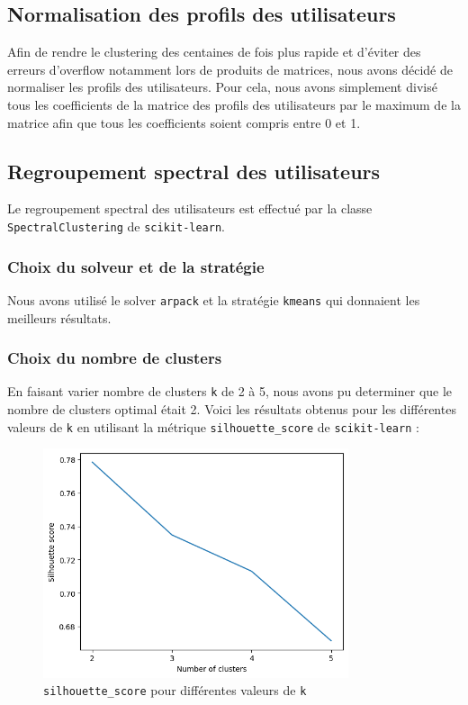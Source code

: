 \documentclass{article}
\begin{document}
\subsection{Normalisation des profils des utilisateurs}
Afin de rendre le clustering des centaines de fois plus rapide et d'éviter des erreurs
d'overflow notamment lors de produits de matrices, nous avons
décidé de normaliser les profils des utilisateurs. Pour cela, nous avons
simplement divisé tous les coefficients de la matrice des profils des utilisateurs
par le maximum de la matrice afin que tous les coefficients soient compris
entre 0 et 1.

\subsection{Regroupement spectral des utilisateurs}
Le regroupement spectral des utilisateurs est effectué par la classe
\texttt{SpectralClustering} de \texttt{scikit-learn}. 

\subsubsection{Choix du solveur et de la stratégie}
Nous avons utilisé le solver
\texttt{arpack} et la stratégie \texttt{kmeans} qui donnaient les meilleurs
résultats.

\subsubsection{Choix du nombre de clusters}
En faisant varier nombre de clusters \texttt{k} de 2 à 5, nous avons pu determiner
que le nombre de clusters optimal était 2. Voici les résultats obtenus pour
les différentes valeurs de \texttt{k} en utilisant la métrique \texttt{silhouette\_score}
de \texttt{scikit-learn} :

\begin{figure}[ht]
  \centering
  \includegraphics[width=0.8\textwidth]{img/silhouette_graph_k.png}
  \caption{\texttt{silhouette\_score} pour différentes valeurs de \texttt{k}}
\end{figure}
\newpage
\end{document}
